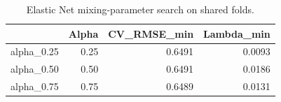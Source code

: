 \begin{table}

\caption{\label{tab:p4-enet-alpha-search}Elastic Net mixing-parameter search on shared folds.}
\centering
\begin{tabular}[t]{lrrr}
\toprule
  & Alpha & CV\_RMSE\_min & Lambda\_min\\
\midrule
alpha\_0.25 & 0.25 & 0.6491 & 0.0093\\
alpha\_0.50 & 0.50 & 0.6491 & 0.0186\\
alpha\_0.75 & 0.75 & 0.6489 & 0.0131\\
\bottomrule
\end{tabular}
\end{table}
